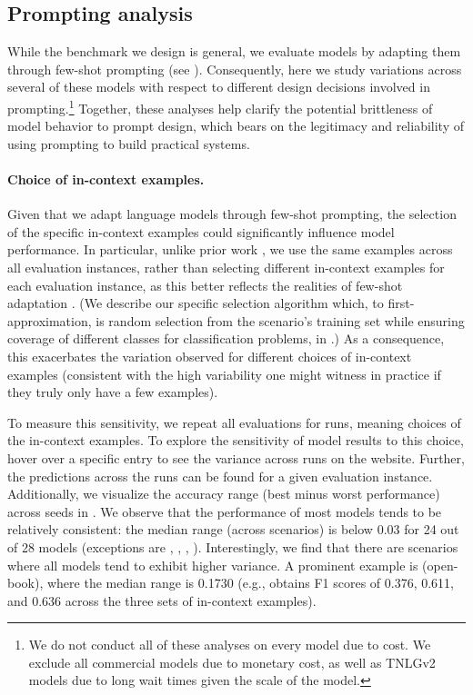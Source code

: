 \hypertarget{prompting-analysis}{\subsection{Prompting analysis}}
\label{sec:prompting-analysis}
While the benchmark we design is general, we evaluate \nummodels models by adapting them through few-shot prompting (see ).
Consequently, here we study variations across several of these models with respect to different design decisions involved in prompting.\footnote{We do not conduct all of these analyses on every model due to cost. We exclude all commercial models due to monetary cost, as well as TNLGv2 models due to long wait times given the scale of the model.}
Together, these analyses help clarify the potential brittleness of model behavior to prompt design, which bears on the legitimacy and reliability of using prompting to build practical systems.

\paragraph{Choice of in-context examples.}
Given that we adapt language models through few-shot prompting, the selection of the specific in-context examples could significantly influence model performance.
In particular, unlike prior work \citep[\eg][]{brown2020gpt3}, we use the same examples across all evaluation instances, rather than selecting different in-context examples for each evaluation instance, as this better reflects the realities of few-shot adaptation \citep{perez2021true}.
(We describe our specific selection algorithm which, to first-approximation, is random selection from the scenario's training set while ensuring coverage of different classes for classification problems, in .)
As a consequence, this exacerbates the variation observed for different choices of in-context examples (consistent with the high variability one might witness in practice if they truly only have a few examples). 

To measure this sensitivity, we repeat all evaluations for \numruns runs, meaning \numruns choices of the in-context examples.
To explore the sensitivity of model results to this choice, hover over a specific entry to see the variance across runs on the website.
Further, the predictions across the \numruns runs can be found for a given evaluation instance.
Additionally, we visualize the accuracy range (best minus worst performance) across seeds in .
We observe that the performance of most models tends to be relatively consistent: the median range (across scenarios) is below 0.03 for 24 out of 28 models (exceptions are \yalm, \gptdavinci, \gptcurie, \gptada).
Interestingly, we find that there are scenarios where all models tend to exhibit higher variance.
A prominent example is \naturalquestions (open-book), where the median range is 0.1730 (e.g., \gptdavinci obtains F1 scores of 0.376, 0.611, and 0.636 across the three sets of in-context examples).

